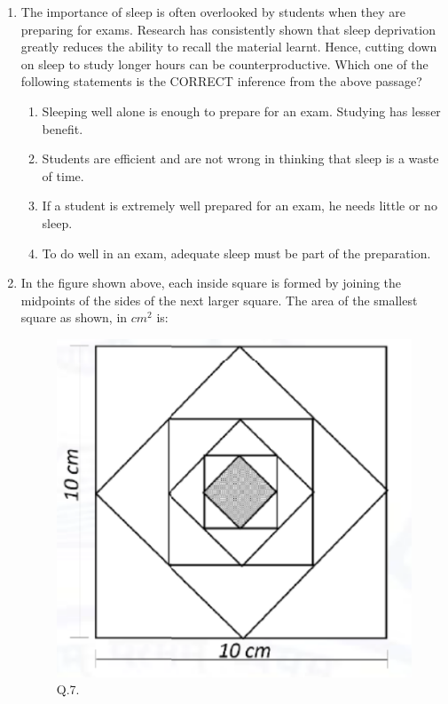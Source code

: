 \documentclass[journal,12pt,onecolumn]{IEEEtran}
\theoremstyle{remark}
\begin{document}
\begin{enumerate}
    \item The importance of sleep is often overlooked by students when they are preparing for exams. Research has consistently shown that sleep deprivation greatly reduces the ability to recall the material learnt. Hence, cutting down on sleep to study longer hours can be counterproductive. Which one of the following statements is the CORRECT inference from the above passage?\hfill{}
        \begin{enumerate}
            \item Sleeping well alone is enough to prepare for an exam. Studying has lesser benefit.
            \item Students are efficient and are not wrong in thinking that sleep is a waste of time.
            \item If a student is extremely well prepared for an exam, he needs little or no sleep.
            \item To do well in an exam, adequate sleep must be part of the preparation.
        \end{enumerate}
    
    \item In the figure shown above, each inside square is formed by joining the midpoints of the sides of the next larger square. The area of the smallest square  as shown, in $cm^{2}$ is: \hfill{}
        \begin{figure}[h]
            \centering
            \includegraphics[width=0.4\columnwidth]{Figs/fig_2.png}
            \caption{Q.7.}
            \label{fig:q7}
        \end{figure}
    
        \begin{enumerate}
        \end{enumerate}
    

\end{enumerate}
\end{document}
